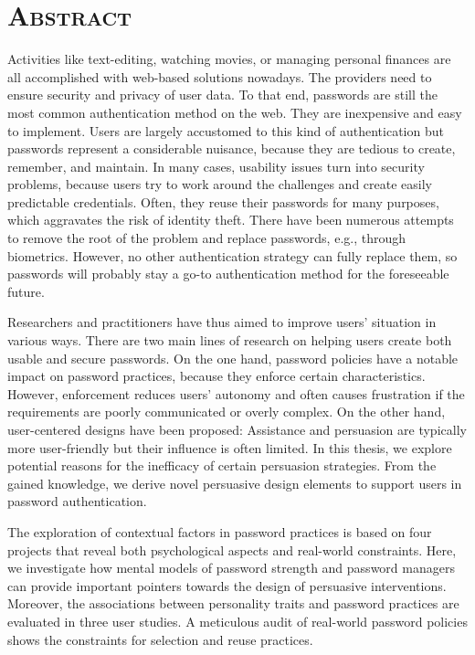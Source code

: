 \section*{\LARGE\rmfamily\bfseries\scshape{Abstract}}
Activities like text-editing, watching movies, or managing personal finances are all accomplished with web-based solutions nowadays. The providers need to ensure security and privacy of user data. To that end, passwords are still the most common authentication method on the web. They are inexpensive and easy to implement. Users are largely accustomed to this kind of authentication but passwords represent a considerable nuisance, because they are tedious to create, remember, and maintain. In many cases, usability issues turn into security problems, because users try to work around the challenges and create easily predictable credentials. Often, they reuse their passwords for many purposes, which aggravates the risk of identity theft. There have been numerous attempts to remove the root of the problem and replace passwords, e.g., through biometrics. However, no other authentication strategy can fully replace them, so passwords will probably stay a go-to authentication method for the foreseeable future.

Researchers and practitioners have thus aimed to improve users' situation in various ways. There are two main lines of research on helping users create both usable and secure passwords. On the one hand, password policies have a notable impact on password practices, because they enforce certain characteristics. However, enforcement reduces users' autonomy and often causes frustration if the requirements are poorly communicated or overly complex. On the other hand, user-centered designs have been proposed: Assistance and persuasion are typically more user-friendly but their influence is often limited. In this thesis, we explore potential reasons for the inefficacy of certain persuasion strategies. From the gained knowledge, we derive novel persuasive design elements to support users in password authentication.

The exploration of contextual factors in password practices is based on four projects that reveal both psychological aspects and real-world constraints. Here, we investigate how mental models of password strength and password managers can provide important pointers towards the design of persuasive interventions. Moreover, the associations between personality traits and password practices are evaluated in three user studies. A meticulous audit of real-world password policies shows the constraints for selection and reuse practices.

